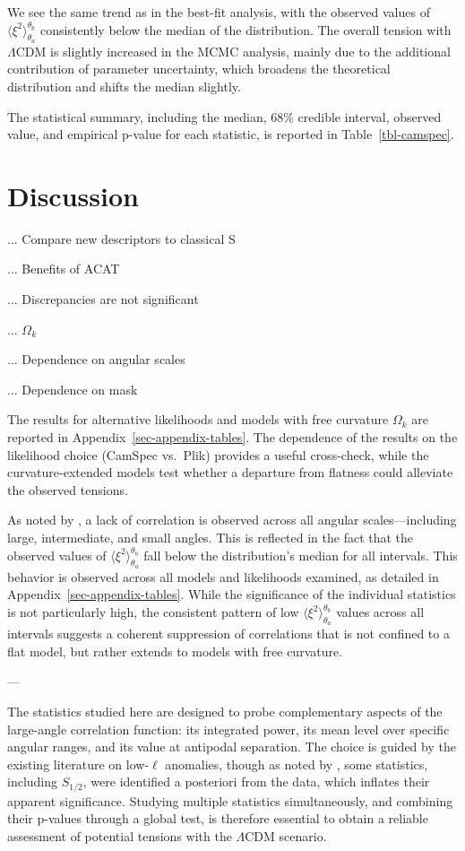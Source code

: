 \documentclass[apj,twocolumn,numberedappendix]{openjournal}
\begin{document}
We see the same trend as in the best-fit analysis, with the observed
values of $\langle\xi^2\rangle_{\theta_a}^{\theta_b}$ consistently below the median of
the distribution. The overall tension with $\Lambda$CDM is slightly
increased in the MCMC analysis, mainly due to the additional
contribution of parameter uncertainty, which broadens the theoretical
distribution and shifts the median slightly.

The statistical summary, including the median, 68\% credible interval,
observed value, and empirical p-value for each statistic, is reported in
Table~\ref{tbl-camspec}.

\section{Discussion}\label{sec-discussion}

... Compare new descriptors to classical S

... Benefits of ACAT

... Discrepancies are not significant

... $\Omega_k$

... Dependence on angular scales

... Dependence on mask

The results for alternative likelihoods and models with free curvature
$\Omega_k$ are reported in
Appendix~\ref{sec-appendix-tables}. The dependence of
the results on the likelihood choice (CamSpec vs.\ Plik) provides a
useful cross-check, while the curvature-extended models test whether a
departure from flatness could alleviate the observed tensions.

As noted by \citep{Kim2011}, a lack of correlation is observed across
all angular scales---including large, intermediate, and small angles.
This is reflected in the fact that the observed values of
$\langle\xi^2\rangle_{\theta_a}^{\theta_b}$ fall below the distribution's median for all
intervals. This behavior is observed across all models and likelihoods
examined, as detailed in
Appendix~\ref{sec-appendix-tables}. While the
significance of the individual statistics is not particularly high, the
consistent pattern of low $\langle\xi^2\rangle_{\theta_a}^{\theta_b}$ values across all
intervals suggests a coherent suppression of correlations that is not
confined to a flat model, but rather extends to models with free
curvature.

---

The statistics studied here are designed to probe complementary aspects of the large-angle correlation function: its integrated power, its mean level over specific angular ranges, and its value at antipodal separation.
The choice is guided by the existing literature on low-$\ell$ anomalies, though as noted by \citet{Efstathiou_2010}, some statistics, including $S_{1/2}$, were identified a posteriori from the data, which inflates their apparent significance.
Studying multiple statistics simultaneously, and combining their p-values through a global test, is therefore essential to obtain a reliable assessment of potential tensions with the $\Lambda$CDM scenario.
\end{document}
